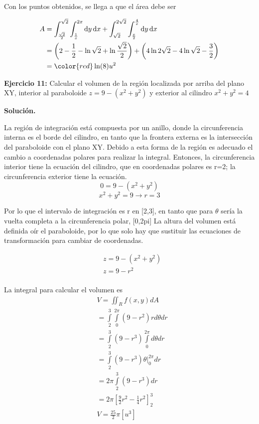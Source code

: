 \documentclass[12pt]{article}
\DeclareMathOperator{\di}{d\!}
\begin{document}
Con los puntos obtenidos, se llega a que el área debe ser

\begin{align*}
	A &= \int_{\frac{\sqrt{2}}{2}}^{\sqrt{2}}\int_{\frac{1}{x}}^{2x} \di y \di x
	+ \int_{\sqrt{2}}^{2\sqrt{2}}\int_{\frac{x}{2}}^{\frac{4}{x}} \di y \di x \\
	&=\left(2-\frac{1}{2}-\ln{\sqrt{2}}+ \ln{\frac{\sqrt{2}}{2}}\right) 
	+\left(4\ln{2\sqrt{2}}-4\ln{\sqrt{2}}-\frac{3}{2}\right) \\
	&=\color{red}\ln(8) u^2
\end{align*}

\noindent \textbf{Ejercicio 11:} Calcular el volumen de la región localizada por arriba del plano XY, interior al paraboloide $z=9-({{x}^{2}}+{{y}^{2}})$
y exterior al cilindro ${{x}^{2}}+{{y}^{2}}=4$

\vspace{5mm}
\noindent \textbf{Solución.}
\vspace{5mm}

La región de integración está compuesta por un anillo, donde la circunferencia interna es el borde del cilindro, en tanto que la frontera externa es la intersección del paraboloide con el plano XY. Debido a esta forma de la región es adecuado el cambio a coordenadas polares para realizar la integral. Entonces, la circunferencia interior tiene la ecuación del cilindro, que en coordenadas polares es r=2; la circunferencia exterior tiene la ecuación.
\[0=9-({{x}^{2}}+{{y}^{2}})\]
\[{{x}^{2}}+{{y}^{2}}=9\to r=3\]

Por lo que el intervalo de integración es r en [2,3], en tanto que para  $\theta $ sería la vuelta completa a la circunferencia polar, [0,2pi]
La altura del volumen está definida oír el paraboloide, por lo que solo hay que sustituir las ecuaciones de transformación para cambiar de coordenadas.

\begin{align}
  & z=9-({{x}^{2}}+{{y}^{2}}) \\ 
 & z=9-{{r}^{2}} \\ 
\end{align}

La integral para calcular el volumen es
\begin{align}
  & V=\iint_{R}{f(x,y)dA} \\ 
 & =\int\limits_{2}^{3}{\int\limits_{0}^{2\pi }{(9-{{r}^{2}})rd\theta dr}} \\ 
 & =\int\limits_{2}^{3}{(9-{{r}^{3}})\int\limits_{0}^{2\pi }{d\theta dr}} \\ 
 & =\int\limits_{2}^{3}{(9-{{r}^{3}})}\left. \theta  \right|_{0}^{2\pi }dr \\ 
 & =2\pi \int\limits_{2}^{3}{(9-{{r}^{3}})}dr \\ 
 & =2\pi \left[ \frac{9}{2}{{r}^{2}}-\frac{1}{4}{{r}^{2}} \right]_{2}^{3} \\ 
 & V=\frac{25}{2}\pi [{{u}^{3}}] \\ 
\end{align}
\end{document}
